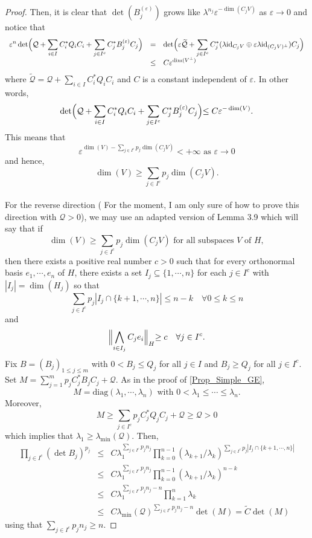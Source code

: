 \documentclass[11pt,a4paper,reqno]{amsart}
\numberwithin{equation}{section}
\theoremstyle{definition}
\newcommand{\ds}{\displaystyle}
\renewcommand{\tilde}{\widetilde}
\newcommand{\<}{\ensuremath \leq}
\renewcommand{\>}{\ensuremath \geq}
\renewcommand{\epsilon}{\varepsilon}
\renewcommand{\tilde}{\widetilde}
\begin{document}
\begin{proof}
Then, it is clear that $\det(B_j^{(\epsilon)})$ grows like $\lambda^{n_j}\epsilon^{-\dim(C_jV)}$ as $\epsilon \rightarrow 0$ and notice that $$\begin{array}{lll}
\ds \epsilon^n \det\Bigl(\mathcal Q+\sum_{i \in I}C_i^*Q_iC_i+\sum_{j \in I^c} C_j^*B_j^{(\epsilon)}C_j\Bigl) &=& \ds \det \Bigl(\epsilon \tilde{\mathcal Q}+\sum_{j \in I^c}C_j^*(\lambda \mathrm{id}_{C_jV} \oplus \epsilon \lambda \mathrm{id}_{(C_jV)^\perp})C_j \Bigl) \\
&\le& \ds C\epsilon^{\dim(V^\perp)}
\end{array}$$ where $\tilde{\mathcal Q}=\mathcal Q+\sum_{i \in I}C_i^*Q_iC_i$ and $C$ is a constant independent of $\epsilon.$ In other words, $$\det\Bigl(\mathcal Q+\sum_{i \in I}C_i^*Q_iC_i+\sum_{j \in I^c} C_j^*B_j^{(\epsilon)}C_j\Bigl) \le C\epsilon^{-\dim(V)}.$$ This means that $$\epsilon^{\dim(V)-\sum_{j \in I^c}p_j\dim(C_jV)}<+\infty \text{ as } \epsilon \rightarrow 0$$ and hence, $$\dim(V) \ge \sum_{j \in I^c}p_j\dim(C_jV).$$
\hfill \\
For the reverse direction ({\color{red} For the moment, I am only sure of how to prove this direction with $\mathcal Q>0$}), we may use an adapted version of Lemma 3.9 which will say that if $$\dim(V) \ge \sum_{j \in I^c}p_j\dim(C_jV) \text{ for all subspaces } V \text{ of } H,$$ then there exists a positive real number $c>0$ such that for every orthonormal basis $e_1,\cdots,e_n$ of $H$, there exists a set $I_j \subseteq \{1,\cdots,n\}$ for each $j \in I^c$ with $|I_j|=\dim(H_j)$ so that $$\sum_{j \in I^c} p_j|I_j \cap \{k+1,\cdots,n\}| \le n-k \quad \forall 0 \le k \le n$$ and $$\Bigl\| \bigwedge_{i \in I_j}C_je_i \Bigl\|_H \ge c \quad \forall j \in I^c.$$ Fix $B=(B_j)_{1 \le j \le m}$ with $0<B_j \le Q_j$ for all $j \in I$ and $B_j \ge Q_j$ for all $j \in I^c.$
Set $M=\sum_{j=1}^m p_jC_j^*B_jC_j+\mathcal Q.$
As in the proof of \cref{Prop_Simple_GE}, $$M=\mathrm{diag}(\lambda_1,\cdots,\lambda_n) \text{ with } 0<\lambda_1 \le \cdots \le \lambda_n.$$ Moreover, $$M \ge \sum_{j \in I^c}p_jC_j^*Q_jC_j+\mathcal Q \ge \mathcal Q>0$$ which implies that $\lambda_1 \ge \lambda_{\mathrm{min}}(\mathcal Q).$ Then, $$\begin{array}{lll}
\ds \prod_{j \in I^c}(\det B_j)^{p_j} &\le& \ds C\lambda_1^{\sum_{j \in I^c}p_j n_j} \prod_{k=0}^{n-1}(\lambda_{k+1}/\lambda_k)^{\sum_{j \in I^c}p_j|I_j \cap \{k+1,\cdots,n\}|} \\
&\le& \ds C\lambda_1^{\sum_{j \in I^c}p_jn_j}\prod_{k=0}^{n-1}(\lambda_{k+1}/\lambda_k)^{n-k} \\
&\le& \ds C\lambda_1^{\sum_{j \in I^c}p_jn_j-n}\prod_{k=1}^n \lambda_k \\
&\le& \ds C\lambda_{\min}(\mathcal Q)^{\sum_{j \in I^c}p_jn_j-n}\det(M)=\tilde C \det(M)
\end{array}$$ using that $\sum_{j \in I^c}p_jn_j \ge n.$
\end{proof}
\fi
\end{document}
